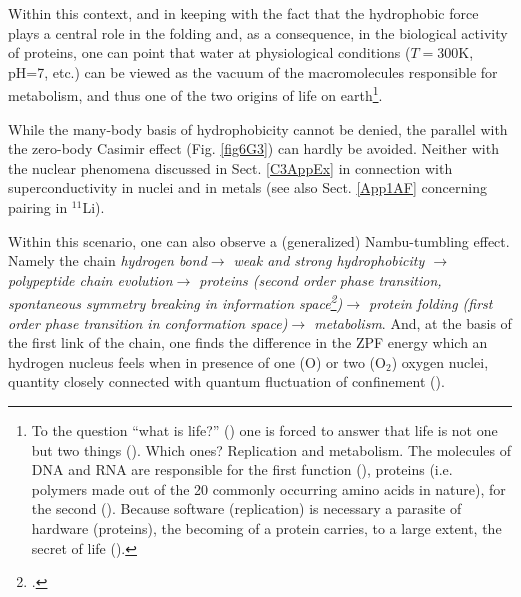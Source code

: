 \begin{subappendices}
Within this context, and in keeping with the fact that the hydrophobic force plays a central role in the folding and, as a consequence, in the biological activity of proteins, one can point that water at physiological conditions ($T=$300K, pH=7, etc.) can be viewed as the vacuum of the macromolecules responsible for metabolism, and thus one of the two origins of life on earth\footnote{To the question ``what is life?'' (\cite{Schrodinger:44}) one is forced to answer that life is not one but two things (\cite{Dyson:99}). Which ones? Replication and metabolism. The molecules of DNA and RNA are responsible for the first function (\cite{Watson:53,Watson:80}), proteins (i.e. polymers made out of the 20 commonly occurring amino acids in nature), for the second (\cite{Sanger:52}). Because software (replication) is necessary a parasite of hardware (proteins), the becoming of a protein carries, to a large extent, the secret of life (\cite{Monod:70}).}.


While the many-body basis of hydrophobicity cannot be denied,  the parallel with the zero-body Casimir effect (Fig. \ref{fig6G3}) can hardly be avoided. Neither with the nuclear phenomena  discussed in Sect. \ref{C3AppEx} in connection with superconductivity  in nuclei and in metals (see also Sect. \ref{App1AF} concerning pairing in $^{11}$Li).

Within this scenario, one can also observe a (generalized) Nambu-tumbling effect. Namely  the chain \textit{hydrogen bond$\to$ weak and strong hydrophobicity $\to$ polypeptide chain evolution$\to$ proteins (second order phase transition, spontaneous symmetry breaking in information space\footnote{\cite{Broglia:13b}.})$\to$ protein folding (first order phase transition in conformation space)$\to$ metabolism}. And, at the basis of the first link of the chain,  one finds the difference in the ZPF energy which an hydrogen nucleus feels when in presence of one (O) or two (O$_2$) oxygen nuclei, quantity closely connected with quantum fluctuation of confinement (\cite{Povh:02}).




\end{subappendices}
%
